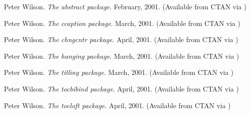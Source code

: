 \begin{thebibliography}{GMS94A}
  Peter Wilson.
  \newblock \emph{The abstract package}.
  \newblock February, 2001.
  \newblock (Available from CTAN via
            )

\begin{comment}
\LMnote{2010/09/28}{Removed as it no longer exist}
\bibitem[Wil01b]{CHNGPAGE}
  Peter Wilson.
  \newblock \emph{The changepage package}.
  \newblock February, 2001.
  \newblock (Available from CTAN via 
            \CTANurl{/macros/latex/contrib/changepage/})

\bibitem[Wil01c]{APPENDIX}
  Peter Wilson.
  \newblock \emph{The appendix package}.
  \newblock March, 2001.
  \newblock (Available from CTAN in 
            \url{/macros/latex/contrib/appendix})
\end{comment}

  Peter Wilson.
  \newblock \emph{The ccaption package}.
  \newblock March, 2001.
  \newblock (Available from CTAN via 
            )

  Peter Wilson.
  \newblock \emph{The chngcntr package}.
  \newblock April, 2001.
  \newblock (Available from CTAN via 
            )

  Peter Wilson.
  \newblock \emph{The hanging package}.
  \newblock March, 2001.
  \newblock (Available from CTAN via 
            )

  Peter Wilson.
  \newblock \emph{The titling package}.
  \newblock March, 2001.
  \newblock (Available from CTAN via 
            )

  Peter Wilson.
  \newblock \emph{The tocbibind package}.
  \newblock April, 2001.
  \newblock (Available from CTAN via 
            )

  Peter Wilson.
  \newblock \emph{The tocloft package}.
  \newblock April, 2001.
  \newblock (Available from CTAN via 
            )


\begin{comment}
\bibitem[Wil01j]{MEMOIR}
  Peter Wilson.
  \newblock \emph{The LaTeX memoir class for configurable book 
                  typesetting: Source code}.
  \newblock July, 2001.
  \newblock (Available from CTAN in 
            \url{/macros/latex/contrib/memoir})


\end{comment}
\end{thebibliography}
